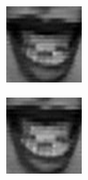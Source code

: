 \begin{figure}
\begin{subfigure}[b]{0.15\textwidth}
		\caption{}
		\label{fig:timeseriesHappy:f}
	\end{subfigure}
	\begin{subfigure}[b]{0.15\textwidth}
		\includegraphics[width=\textwidth]{./img/timeseriesHappy/S026_006_00000007.png}
		\caption{}
		\label{fig:timeseriesHappy:g}
	\end{subfigure}
	\begin{subfigure}[b]{0.15\textwidth}
		\includegraphics[width=\textwidth]{./img/timeseriesHappy/S026_006_00000008.png}

\end{subfigure}
\end{figure}
